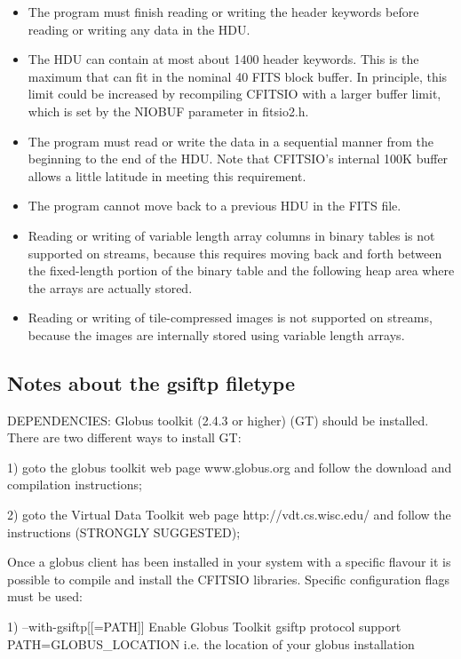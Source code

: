 \documentclass[11pt]{book}
\begin{document}
\begin{itemize}
\item
The program must finish reading or writing the header keywords
before reading or writing any data in the HDU.
\item
The HDU can contain at most about 1400 header keywords.  This is the
maximum that can fit in the nominal 40 FITS block buffer.  In principle,
this limit could be increased by recompiling CFITSIO with a larger
buffer limit, which is set by the NIOBUF parameter in fitsio2.h.
\item
The program must read or write the data in a sequential manner from the
beginning to the end of the HDU.  Note that CFITSIO's internal
100K buffer allows a little latitude in meeting this requirement.
\item
The program cannot move back to a previous HDU in the FITS file.
\item
Reading or writing of variable length array columns in binary tables is not
supported on streams, because this requires moving back and forth between the
fixed-length portion of the binary table and the following heap area where the
arrays are actually stored.
\item
Reading or writing of tile-compressed images is not supported on streams,
because the images are internally stored using variable length arrays.
\end{itemize}


\subsection{Notes about the gsiftp filetype}

DEPENDENCIES: Globus toolkit (2.4.3 or higher) (GT) should be installed.
There are two different ways to install GT:

1) goto the globus toolkit web page www.globus.org and follow the
   download and compilation instructions;

2) goto the Virtual Data Toolkit web page http://vdt.cs.wisc.edu/
   and follow the instructions (STRONGLY SUGGESTED);

Once a globus client has been installed in your system with a specific flavour
it is possible to compile and install the CFITSIO libraries.
Specific configuration flags must be used:

1)  --with-gsiftp[[=PATH]] Enable Globus Toolkit gsiftp protocol support
    PATH=GLOBUS\_LOCATION i.e. the location of your globus installation
\end{document}

